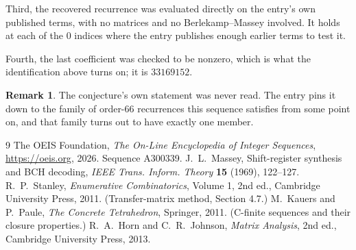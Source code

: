 \documentclass[11pt,a4paper]{article}
\theoremstyle{plain}
\theoremstyle{definition}
\newtheorem{remark}[theorem]{Remark}
\begin{document}
Third, the recovered recurrence was evaluated directly on the entry's own published terms, with
no matrices and no Berlekamp--Massey involved. It holds at each of the $0$ indices where
the entry publishes enough earlier terms to test it.

Fourth, the last coefficient was checked to be nonzero, which is what the identification above
turns on; it is $33169152$.

\begin{remark}
The conjecture's own statement was never read. The entry pins it down to the family of
order-$66$ recurrences this sequence satisfies from some point on, and that family turns
out to have exactly one member.
\end{remark}

\begin{thebibliography}{9}
 The OEIS Foundation, \emph{The On-Line Encyclopedia of Integer
Sequences}, \url{https://oeis.org}, 2026. Sequence A300339.
 J.~L.~Massey, Shift-register synthesis and BCH decoding, \emph{IEEE
Trans. Inform. Theory} \textbf{15} (1969), 122--127.
 R.~P.~Stanley, \emph{Enumerative Combinatorics}, Volume 1, 2nd ed.,
Cambridge University Press, 2011. (Transfer-matrix method, Section 4.7.)
 M.~Kauers and P.~Paule, \emph{The Concrete Tetrahedron}, Springer, 2011.
(C-finite sequences and their closure properties.)
 R.~A.~Horn and C.~R.~Johnson, \emph{Matrix Analysis}, 2nd ed., Cambridge
University Press, 2013.
\end{thebibliography}
\end{document}

